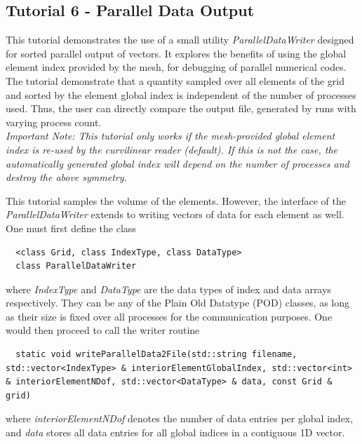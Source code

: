 \subsection{Tutorial 6 - Parallel Data Output}

This tutorial demonstrates the use of a small utility \textit{ParallelDataWriter} designed for sorted parallel output of vectors. It explores the benefits of using the global element index provided by the mesh, for debugging of parallel numerical codes. The tutorial demonstrate that a quantity sampled over all elements of the grid and sorted by the element global index is independent of the number of processes used. Thus, the user can directly compare the output file, generated by runs with varying process count. \\

\noindent
\textit{Important Note: This tutorial only works if the mesh-provided global element index is re-used by the curvilinear \gmsh{} reader (default). If this is not the case, the automatically generated global index will depend on the number of processes and destroy the above symmetry.}

\noindent
This tutorial samples the volume of the elements. However, the interface of the \textit{ParallelDataWriter} extends to writing vectors of data for each element as well. One must first define the class

\begin{mybox}
\begin{lstlisting}
  <class Grid, class IndexType, class DataType>
  class ParallelDataWriter
\end{lstlisting}
\end{mybox}

\noindent
where \textit{IndexType} and \textit{DataType} are the data types of index and data arrays respectively. They can be any of the Plain Old Datatype (POD) classes, as long as their size is fixed over all processes for the communication purposes. One would then proceed to call the writer routine

\begin{mybox}
\begin{lstlisting}
  static void writeParallelData2File(std::string filename, std::vector<IndexType> & interiorElementGlobalIndex, std::vector<int> & interiorElementNDof, std::vector<DataType> & data, const Grid & grid)
\end{lstlisting}
\end{mybox}

\noindent
where \textit{interiorElementNDof} denotes the number of data entries per global index, and \textit{data} stores all data entries for all global indices in a contiguous 1D vector. \\


